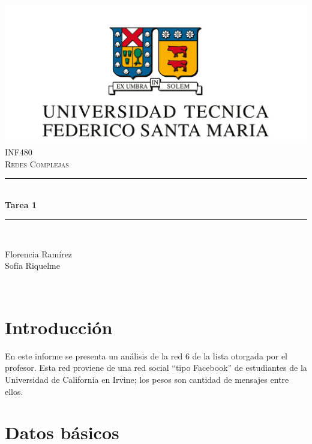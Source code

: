 \documentclass[12pt]{article}
\begin{document}
\begin{titlepage}
\newcommand{\HRule}{\rule{\linewidth}{0.5mm}} 
\center

\includegraphics[scale=0.4]{images/logo-usm.png}\\
\vspace{0.6cm}
\textsc{\large INF480}\\[0.5cm] %
\textsc{\Large Redes Complejas}\\[0.5cm] %

\HRule \\[0.4cm]
{ \huge \bfseries Tarea 1}\\[0.4cm] %
\HRule \\[1.5cm]
 
\begin{minipage}{0.4\textwidth}
\begin{center} \large
Florencia Ramírez\\
Sofía Riquelme
\end{center}

\end{minipage}\\[2cm]

\vfill %

\end{titlepage}

\section{Introducción}
En este informe se presenta un análisis de la red 6 de la lista otorgada por el profesor. Esta red proviene de una red social ``tipo Facebook'' de estudiantes de la Universidad de California en Irvine; los pesos son cantidad de mensajes entre ellos.

\section{Datos básicos}
\end{document}
